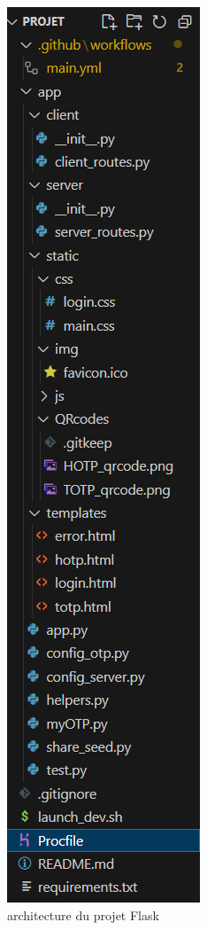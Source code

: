 \documentclass[a4paper, 10pt]{article}
\begin{document}
\begin{figure}[H]
        \centering
        \includegraphics[scale=1]{img/C_proto/achi.png}
        \caption{architecture du projet Flask\\}
        \label{fig:proto-archi}
\end{figure}
\end{document}
